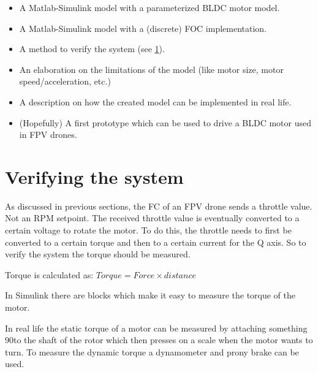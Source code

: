 \documentclass[]{report}
\begin{document}
\begin{itemize}
	\item A Matlab-Simulink model with a parameterized BLDC motor model.
	\item A Matlab-Simulink model with a (discrete) FOC implementation.
	\item A method to verify the system (see \ref{section:Verifying_the_system}).
	\item An elaboration on the limitations of the model (like motor size, motor speed/acceleration, etc.)
	\item A description on how the created model can be implemented in real life.
	\item (Hopefully) A first prototype which can be used to drive a BLDC motor used in FPV drones.
\end{itemize}

\section{Verifying the system} \label{section:Verifying_the_system}
As discussed in previous sections, the FC of an FPV drone sends a throttle value. Not an RPM setpoint. The received throttle value is eventually converted to a certain voltage to rotate the motor. To do this, the throttle needs to first be converted to a certain torque and then to a certain current for the Q axis. So to verify the system the torque should be measured.

Torque is calculated as: $Torque = Force \times distance$

In Simulink there are blocks which make it easy to measure the torque of the motor.

In real life the static torque of a motor can be measured by attaching something 90\degree to the shaft of the rotor which then presses on a scale when the motor wants to turn. To measure the dynamic torque a dynamometer and prony brake \cite{Bench_Top_Dynomometer} can be used.

\printbibliography
\end{document}
